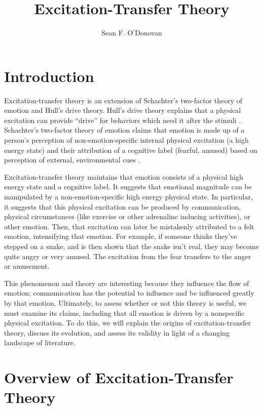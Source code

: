\documentclass[
  stu]{apa7}
\affiliation{Brian Lamb School of Communication}
\title{Excitation-Transfer Theory}
\author{Sean F. O'Donovan}
\date{}
\begin{document}
\maketitle

\hypertarget{introduction}{%
\section{Introduction}\label{introduction}}

Excitation-transfer theory is an extension of Schachter's two-factor
theory of emotion and Hull's drive theory. Hull's drive theory explains
that a physical excitation can provide ``drive'' for behaviors which
need it after the stimuli \autocite[
33]{bryExcitationTransferTheoryThreeFactor}. Schachter's two-factor
theory of emotion claims that emotion is made up of a person's
perception of non-emotion-specific internal physical excitation (a high
energy state) and their attribution of a cognitive label (fearful,
amused) based on perception of external, environmental cues \autocite[
33]{bryExcitationTransferTheoryThreeFactor}.

Excitation-transfer theory maintains that emotion consists of a physical
high energy state and a cognitive label. It suggests that emotional
magnitude can be manipulated by a non-emotion-specific high energy
physical state. In particular, it suggests that this physical excitation
can be produced by communication, physical circumstances (like exercise
or other adrenaline inducing activities), or other emotion. Then, that
excitation can later be mistakenly attributed to a felt emotion,
intensifying that emotion. For example, if someone thinks they've
stepped on a snake, and is then shown that the snake isn't real, they
may become quite angry or very amused. The excitation from the fear
transfers to the anger or amusement.

This phenomenon and theory are interesting because they influence the
flow of emotion; communication has the potential to influence and be
influenced greatly by that emotion. Ultimately, to assess whether or not
this theory is useful, we must examine its claims, including that all
emotion is driven by a nonspecific physical excitation. To do this, we
will explain the origins of excitation-transfer theory, discuss its
evolution, and assess its validity in light of a changing landscape of
literature.

\hypertarget{overview-of-excitation-transfer-theory}{%
\section{Overview of Excitation-Transfer
Theory}\label{overview-of-excitation-transfer-theory}}
\end{document}
